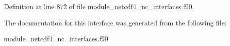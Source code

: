 Definition at line 872 of file module\+\_\+netcdf4\+\_\+nc\+\_\+interfaces.\+f90.



The documentation for this interface was generated from the following file\+:\begin{DoxyCompactItemize}
\item 
\hyperlink{module__netcdf4__nc__interfaces_8f90}{module\+\_\+netcdf4\+\_\+nc\+\_\+interfaces.\+f90}\end{DoxyCompactItemize}
